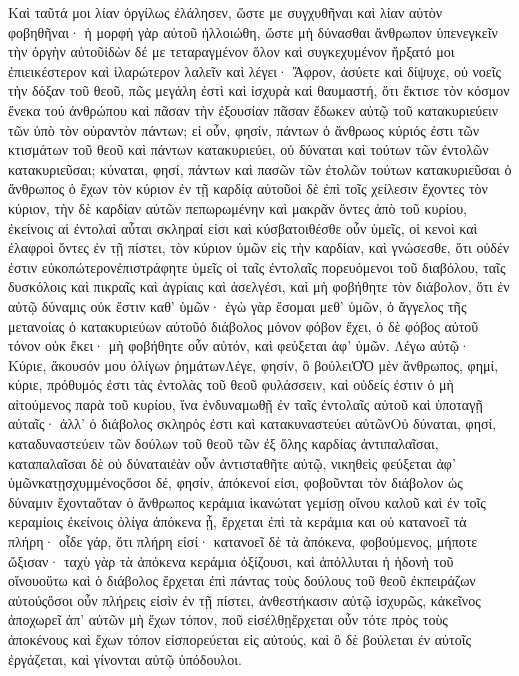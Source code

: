 Καὶ ταῦτά μοι λίαν ὀργίλως ἐλάλησεν, ὥστε με συγχυθῆναι καὶ λίαν αὐτὸν φοβηθῆναι· ἡ μορφὴ γὰρ αὐτοῦ ἠλλοιώθη, ὥστε μὴ δύνασθαι ἄνθρωπον ὑπενεγκεῖν τὴν ὀργὴν αὐτοῦἰδὼν δέ με τεταραγμένον ὅλον καὶ συγκεχυμένον ἤρξατό μοι ἐπιεικέστερον καὶ ἱλαρώτερον λαλεῖν καὶ λέγει· Ἄφρον, ἀσύετε καὶ δίψυχε, οὐ νοεῖς τὴν δόξαν τοῦ θεοῦ, πῶς μεγάλη ἐστὶ καὶ ἰσχυρὰ καὶ θαυμαστή, ὅτι ἔκτισε τὸν κόσμον ἕνεκα τού ἀνθρώπου καὶ πᾶσαν τὴν ἐξουσίαν πᾶσαν ἔδωκεν αὐτῷ τοῦ κατακυριεύειν τῶν ὑπὸ τὸν οὐραντὸν πάντων; εἰ οὖν, φησίν, πάντων ὁ ἄνθρωος κύριός ἐστι τῶν κτισμάτων τοῦ θεοῦ καὶ πάντων κατακυριεύει, οὐ δύναται καὶ τούτων τῶν ἐντολῶν κατακυριεῦσαι; κύναται, φησί, πάντων καὶ πασῶν τῶν ἐτολῶν τούτων κατακυριεῦσαι ὁ ἄνθρωπος ὁ ἔχων τὸν κύριον ἐν τῇ καρδίᾳ αὐτοῦοἱ δὲ ἐπὶ τοῖς χείλεσιν ἔχοντες τὸν κύριον, τὴν δὲ καρδίαν αὐτῶν πεπωρωμένην καὶ μακρᾶν ὄντες ἀπὸ τοῦ κυρίου, ἐκείνοις αἱ ἐντολαὶ αὗται σκληραί εἰσι καὶ κύσβατοιθέσθε οὖν ὑμεῖς, οἱ κενοὶ καὶ ἐλαφροὶ ὄντες ἐν τῇ πίστει, τὸν κύριον ὑμῶν εἰς τὴν καρδίαν, καὶ γνώσεσθε, ὅτι οὐδέν ἐστιν εὐκοπώτερονἐπιστράφητε ὑμεῖς οἱ ταῖς ἐντολαῖς πορευόμενοι τοῦ διαβόλου, ταῖς δυσκόλοις καὶ πικραῖς καὶ ἀγρίαις καὶ ἀσελγέσι, καὶ μὴ φοβήθητε τὸν διάβολον, ὅτι ἐν αὐτῷ δύναμις οὐκ ἔστιν καθ’ ὑμῶν· ἐγὼ γὰρ ἔσομαι μεθ’ ὑμῶν, ὁ ἄγγελος τῆς μετανοίας ὁ κατακυριεύων αὐτοῦὁ διάβολος μόνον φόβον ἔχει, ὁ δὲ φόβος αὐτοῦ τόνον οὐκ ἔκει· μὴ φοβήθητε οὖν αὐτόν, καὶ φεύξεται ἀφ’ ὑμῶν.
Λέγω αὐτῷ· Κύριε, ἄκουσόν μου ὀλίγων ῥημάτωνΛέγε, φησίν, ὃ βούλειὈ̔Ὁ μὲν ἄνθρωπος, φημί, κύριε, πρόθυμός ἐστι τὰς ἐντολὰς τοῦ θεοῦ φυλάσσειν, καὶ οὐδείς ἐστιν ὁ μὴ αἰτούμενος παρὰ τοῦ κυρίου, ἵνα ἐνδυναμωθῇ ἐν ταῖς ἐντολαῖς αὐτοῦ καὶ ὑποταγῇ αὐταῖς· ἀλλ’ ὁ διάβολος σκληρός ἐστι καὶ κατακυναστεύει αὐτῶνΟὐ δύναται, φησί, καταδυναστεύειν τῶν δούλων τοῦ θεοῦ τῶν ἐξ ὅλης καρδίας ἀντιπαλαῖσαι, καταπαλαῖσαι δὲ οὐ δύναταιἐὰν οὖν ἀντισταθῆτε αὐτῷ, νικηθεὶς φεύξεται ἀφ’ ὑμῶνκατῃσχυμμένοςὅσοι δέ, φησίν, ἀπόκενοί εἰσι, φοβοῦνται τὸν διάβολον ὡς δύναμιν ἔχονταὅταν ὁ ἄνθρωπος κεράμια ἱκανώτατ γεμίσῃ οἴνου καλοῦ καὶ ἐν τοῖς κεραμίοις ἐκείνοις ὀλίγα ἀπόκενα ᾖ, ἔρχεται ἐπὶ τὰ κεράμια και οὐ κατανοεῖ τὰ πλήρη· οἶδε γάρ, ὅτι πλήρη εἰσί· κατανοεῖ δὲ τὰ ἀπόκενα, φοβούμενος, μήποτε ὤξισαν· ταχὺ γὰρ τὰ ἀπόκενα κεράμια ὀξίζουσι, καὶ ἀπόλλυται ἡ ἡδονὴ τοῦ οἴνουοὕτω καὶ ὁ διάβολος ἔρχεται ἐπὶ πάντας τοὺς δούλους τοῦ θεοῦ ἐκπειράζων αὐτούςὅσοι οὖν πλήρεις εἰσὶν ἐν τῇ πίστει, ἀνθεστήκασιν αὐτῷ ἰσχυρῶς, κἀκεῖνος ἀποχωρεῖ ἀπ’ αὐτῶν μὴ ἔχων τόπον, ποῦ εἰσέλθῃἔρχεται οὖν τότε πρὸς τοὺς ἀποκένους καὶ ἔχων τόπον εἰσπορεύεται εἰς αὐτούς, καὶ ὃ δὲ βούλεται ἐν αὐτοῖς ἐργάζεται, καὶ γίνονται αὐτῷ ὑπόδουλοι.
